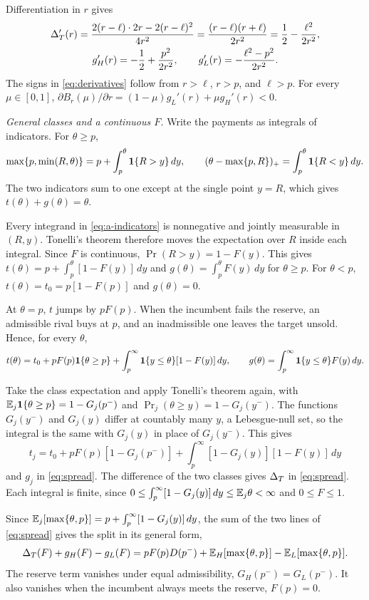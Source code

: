 Differentiation in \(r\) gives
\[
\begin{gathered}
\Delta_T'(r)=\frac{2(r-\ell)\cdot2r-2(r-\ell)^2}{4r^2}=\frac{(r-\ell)(r+\ell)}{2r^2}=\frac12-\frac{\ell^2}{2r^2},\\
g_H'(r)=-\frac12+\frac{p^2}{2r^2},\qquad g_L'(r)=-\frac{\ell^2-p^2}{2r^2}.
\end{gathered}
\]
The signs in \eqref{eq:derivatives} follow from \(r>\ell\), \(r>p\), and \(\ell>p\). For every
\(\mu\in[0,1]\), \(\partial B_r(\mu)/\partial r=(1-\mu)g_L'(r)+\mu g_H'(r)<0\).

\emph{General classes and a continuous \(F\).} Write the payments as integrals of indicators. For
\(\theta\ge p\),
\begin{equation}\label{eq:a-indicators}
\max\{p,\min(R,\theta)\}=p+\int_p^\theta\mathbf{1}\{R>y\}\,dy,
\qquad
(\theta-\max\{p,R\})_+=\int_p^\theta\mathbf{1}\{R<y\}\,dy.
\end{equation}
The two indicators sum to one except at the single point \(y=R\), which gives \(t(\theta)+g(\theta)=\theta\).

Every integrand in \eqref{eq:a-indicators} is nonnegative and jointly measurable in \((R,y)\). Tonelli's theorem
therefore moves the expectation over \(R\) inside each integral. Since \(F\) is continuous,
\(\Pr(R>y)=1-F(y)\). This gives \(t(\theta)=p+\int_p^\theta[1-F(y)]\,dy\) and \(g(\theta)=\int_p^\theta
F(y)\,dy\) for \(\theta\ge p\). For \(\theta<p\), \(t(\theta)=t_0=p[1-F(p)]\) and \(g(\theta)=0\).

At \(\theta=p\), \(t\) jumps by \(pF(p)\). When the incumbent fails the reserve, an admissible rival buys at
\(p\), and an inadmissible one leaves the target unsold. Hence, for every \(\theta\),
\[
t(\theta)=t_0+pF(p)\mathbf{1}\{\theta\ge p\}+\int_p^\infty\mathbf{1}\{y\le\theta\}[1-F(y)]\,dy,\qquad
g(\theta)=\int_p^\infty\mathbf{1}\{y\le\theta\}F(y)\,dy.
\]

Take the class expectation and apply Tonelli's theorem again, with \(\mathbb{E}_j\mathbf{1}\{\theta\ge p\}=1-G_j(p^-)\) and
\(\Pr_j(\theta\ge y)=1-G_j(y^-)\). The functions \(G_j(y^-)\) and \(G_j(y)\) differ at countably many \(y\), a
Lebesgue-null set, so the integral is the same with \(G_j(y)\) in place of \(G_j(y^-)\). This gives
\[
t_j=t_0+pF(p)[1-G_j(p^-)]+\int_p^\infty[1-G_j(y)][1-F(y)]\,dy
\]
and \(g_j\) in \eqref{eq:spread}. The difference of the two classes gives \(\Delta_T\) in \eqref{eq:spread}. Each
integral is finite, since \(0\le\int_p^\infty[1-G_j(y)]\,dy\le\mathbb{E}_j\theta<\infty\) and \(0\le F\le1\).

Since \(\mathbb{E}_j[\max\{\theta,p\}]=p+\int_p^\infty[1-G_j(y)]\,dy\), the sum of the two lines of \eqref{eq:spread}
gives the split in its general form,
\[
\Delta_T(F)+g_H(F)-g_L(F)=pF(p)D(p^-)+\mathbb{E}_H[\max\{\theta,p\}]-\mathbb{E}_L[\max\{\theta,p\}].
\]
The reserve term vanishes under equal admissibility, \(G_H(p^-)=G_L(p^-)\). It also vanishes when the incumbent
always meets the reserve, \(F(p)=0\).

